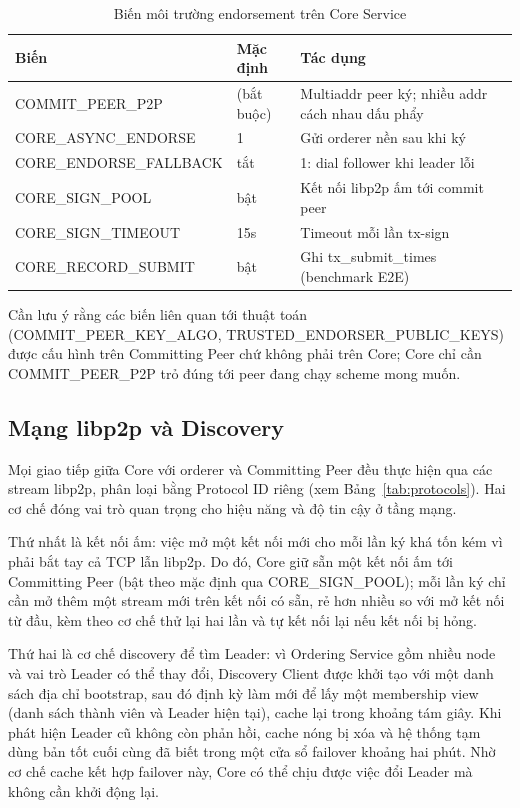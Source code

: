 \begin{table}[H]
\centering
\caption{Biến môi trường endorsement trên Core Service}
\label{tab:core-endorse-env}
\begin{tabular}{@{}p{3.6cm}p{2.2cm}p{5.8cm}@{}}
\toprule
Biến & Mặc định & Tác dụng \\
\midrule
COMMIT\_PEER\_P2P & (bắt buộc) & Multiaddr peer ký; nhiều addr cách nhau dấu phẩy \\
CORE\_ASYNC\_ENDORSE & 1 & Gửi orderer nền sau khi ký \\
CORE\_ENDORSE\_FALLBACK & tắt & 1: dial follower khi leader lỗi \\
CORE\_SIGN\_POOL & bật & Kết nối libp2p ấm tới commit peer \\
CORE\_SIGN\_TIMEOUT & 15s & Timeout mỗi lần tx-sign \\
CORE\_RECORD\_SUBMIT & bật & Ghi tx\_submit\_times (benchmark E2E) \\
\bottomrule
\end{tabular}
\end{table}

Cần lưu ý rằng các biến liên quan tới thuật toán (COMMIT\_PEER\_KEY\_ALGO,
TRUSTED\_ENDORSER\_PUBLIC\_KEYS) được cấu hình trên Committing Peer chứ
không phải trên Core; Core chỉ cần COMMIT\_PEER\_P2P trỏ đúng tới peer
đang chạy scheme mong muốn.

\subsection{Mạng libp2p và Discovery}
\label{sec:core-network}

Mọi giao tiếp giữa Core với orderer và Committing Peer đều thực hiện qua các
stream libp2p, phân loại bằng Protocol ID riêng (xem Bảng~\ref{tab:protocols}).
Hai cơ chế đóng vai trò quan trọng cho hiệu năng và độ tin cậy ở tầng mạng.

Thứ nhất là kết nối ấm: việc mở một kết nối mới cho mỗi lần ký khá tốn kém vì
phải bắt tay cả TCP lẫn libp2p. Do đó, Core giữ sẵn một kết nối ấm tới
Committing Peer (bật theo mặc định qua CORE\_SIGN\_POOL); mỗi lần ký
chỉ cần mở thêm một stream mới trên kết nối có sẵn, rẻ hơn nhiều so với mở kết
nối từ đầu, kèm theo cơ chế thử lại hai lần và tự kết nối lại nếu kết nối bị
hỏng.

Thứ hai là cơ chế discovery để tìm Leader: vì Ordering Service gồm nhiều node
và vai trò Leader có thể thay đổi, Discovery Client được khởi tạo với một danh
sách địa chỉ bootstrap, sau đó định kỳ làm mới để lấy một membership view (danh
sách thành viên và Leader hiện tại), cache lại trong khoảng tám giây. Khi phát
hiện Leader cũ không còn phản hồi, cache nóng bị xóa và hệ thống tạm dùng bản
tốt cuối cùng đã biết trong một cửa sổ failover khoảng hai phút. Nhờ cơ chế
cache kết hợp failover này, Core có thể chịu được việc đổi Leader mà không cần
khởi động lại.

